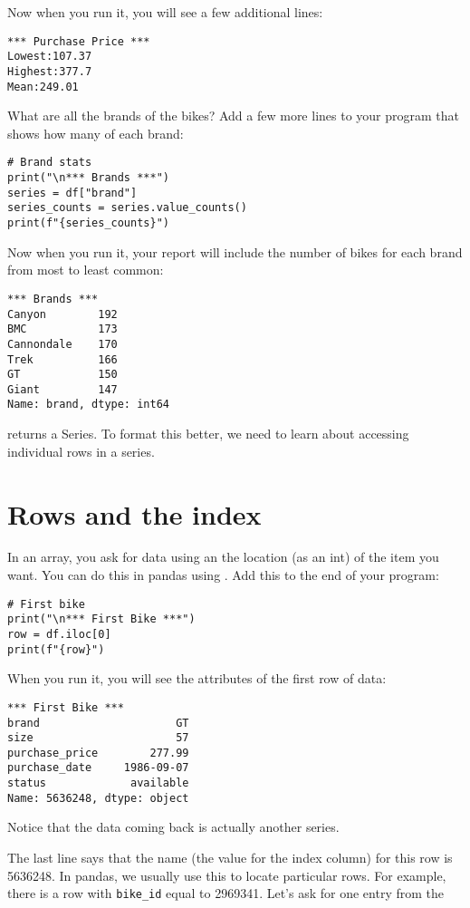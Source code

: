 Now when you run it, you will see a few additional lines:
\begin{Verbatim}
*** Purchase Price ***
Lowest:107.37
Highest:377.7
Mean:249.01
\end{Verbatim}

What are all the brands of the bikes? Add a few more lines to your
program that shows how many of each brand:

\begin{Verbatim}
# Brand stats
print("\n*** Brands ***")
series = df["brand"]
series_counts = series.value_counts()
print(f"{series_counts}")
\end{Verbatim}

Now when you run it, your report will include the number of bikes for
each brand from most to least common:

\begin{Verbatim}
*** Brands ***
Canyon        192
BMC           173
Cannondale    170
Trek          166
GT            150
Giant         147
Name: brand, dtype: int64
\end{Verbatim}

 returns a Series.  To format this better, we
need to learn about accessing individual rows in a series.

\section{Rows and the index}

In an array, you ask for data using an the location (as an int) of the
item you want. You can do this in pandas using . Add
this to the end of your program:

\begin{Verbatim}
# First bike
print("\n*** First Bike ***")
row = df.iloc[0]
print(f"{row}")
\end{Verbatim}

When you run it, you will see the attributes of the first row of data:

\begin{Verbatim}
*** First Bike ***
brand                     GT
size                      57
purchase_price        277.99
purchase_date     1986-09-07
status             available
Name: 5636248, dtype: object
\end{Verbatim}

Notice that the data coming back is actually another series.

The last line says that the name (the value for the index column) for
this row is 5636248.  In pandas, we usually use this to locate
particular rows.  For example, there is a row with \texttt{bike\_id}
equal to 2969341. Let's ask for one entry from the 

